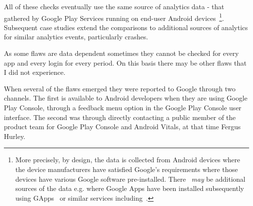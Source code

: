 All of these checks eventually use the same source of analytics data - that gathered by Google Play Services running on end-user Android devices~\footnote{More precisely, by design, the data is collected from Android devices where the device manufacturers have satisfied Google's requirements where those devices have various Google software pre-installed. There ~\emph{may} be additional sources of the data e.g. where Google Apps have been installed subsequently using GApps~\citep{opengapps} or similar services including~\citep{nikgapps}.}.
%
Subsequent case studies extend the comparisons to additional sources of analytics for similar analytics events, particularly crashes.

As some flaws are data dependent sometimes they cannot be checked for every app and every login for every period. On this basis there may be other flaws that I did not experience.

When several of the flaws emerged they were reported to Google through two channels. The first is available to Android developers when they are using Google Play Console, through a feedback menu option in the Google Play Console user interface. The second was through directly contacting a public member of the product team for Google Play Console and Android Vitals, at that time Fergus Hurley. 

